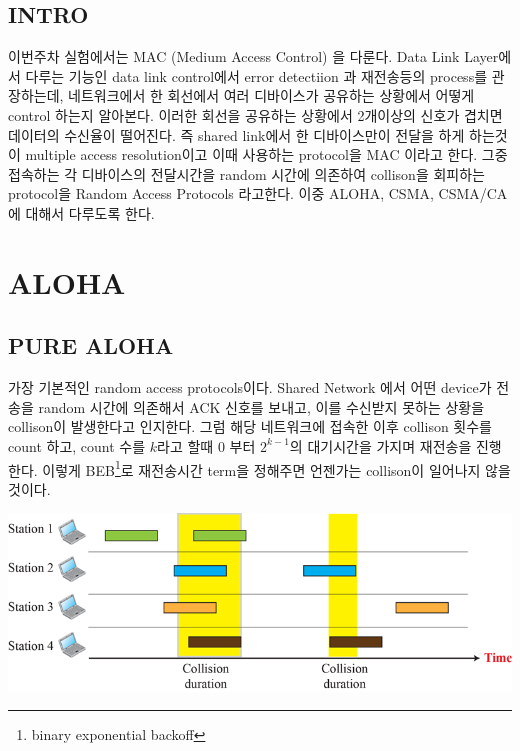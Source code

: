 \begin{multicols}{2}
\subsection*{INTRO}
이번주차 실험에서는 MAC (Medium Access Control) 을 다룬다.  Data Link Layer에서 다루는 기능인 data link control에서 error detectiion 과 재전송등의 process를 관장하는데, 네트워크에서 한 회선에서 여러 디바이스가 공유하는 상황에서 어떻게 control 하는지 알아본다. 이러한 회선을 공유하는 상황에서 2개이상의 신호가 겹치면 데이터의 수신율이 떨어진다. 즉 shared link에서 한 디바이스만이 전달을 하게 하는것이 multiple access resolution이고 이때 사용하는 protocol을 MAC 이라고 한다. 그중접속하는 각 디바이스의 전달시간을 random 시간에 의존하여 collison을 회피하는 protocol을 Random Access Protocols 라고한다. 이중 ALOHA, CSMA, CSMA/CA에 대해서 다루도록 한다.
%
%
\vspace{-4mm}
\section{ALOHA}
\vspace{-2mm}
\subsection{PURE ALOHA}
가장 기본적인 random access protocols이다. Shared Network 에서 어떤 device가 전송을 random 시간에 의존해서 ACK 신호를 보내고, 이를 수신받지 못하는 상황을 collison이 발생한다고 인지한다. 그럼 해당 네트워크에 접속한 이후  collison 횟수를 count 하고, count 수를 $k$라고 할때 0 부터 $2^{k-1}$의 대기시간을 가지며 재전송을 진행한다.  이렇게 BEB\footnote{binary exponential backoff}로 재전송시간 term을 정해주면 언젠가는 collison이 일어나지 않을것이다. \\
    \begin{minipage}{\columnwidth}
    \vspace{2mm}
    \centering%
    \includegraphics[width=.9\columnwidth]{image/week12/1-1.png}
    \vspace{-4mm}
    \end{minipage}
\vspace{-2mm}

\end{multicols}
